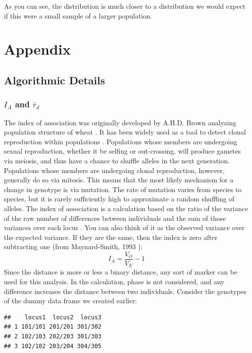 \documentclass[letterpaper]{article}\usepackage[]{graphicx}\usepackage[]{color}
\makeatletter
\newenvironment{kframe}{%
 \def\at@end@of@kframe{}%
 \ifinner\ifhmode%
  \def\at@end@of@kframe{\end{minipage}}%
  \begin{minipage}{\columnwidth}%
 \fi\fi%
 \def\FrameCommand##1{\hskip\@totalleftmargin \hskip-\fboxsep
 \colorbox{shadecolor}{##1}\hskip-\fboxsep
     \hskip-\linewidth \hskip-\@totalleftmargin \hskip\columnwidth}%
 \MakeFramed {\advance\hsize-\width
   \@totalleftmargin\z@ \linewidth\hsize
   \@setminipage}}%
 {\par\unskip\endMakeFramed%
 \at@end@of@kframe}
\newenvironment{knitrout}{}{} %
\newcommand{\beq}{\begin{equation}}
\newcommand{\eeq}{\end{equation}}
\newcommand{\tab}{\hspace*{1em}}
\makeatother
\begin{document}
As you can see, the distribution is much closer to a distribution we would expect if this were a small sample of a larger population. 


\section{Appendix}\label{appendix}
\subsection{Algorithmic Details}\label{appendix:algorithm}
\subsubsection{$I_A$ and $\bar r_d$}\label{appendix:algorithm:iard}

\tab \tab The index of association was originally developed by A.H.D. Brown analyzing population structure of wheat \cite{Brown:1980}. It has been widely used as a tool to detect clonal reproduction within populations \cite{Smith:1993}. Populations whose members are undergoing sexual reproduction, whether it be selfing or out-crossing, will produce gametes via meiosis, and thus have a chance to shuffle alleles in the next generation. Populations whose members are undergoing clonal reproduction, however, generally do so via mitosis. This means that the most likely mechanism for a change in genotype is via mutation. The rate of mutation varies from species to species, but it is rarely sufficiently high to approximate a random shuffling of alleles. The index of association is a calculation based on the ratio of the variance of the raw number of differences between individuals and the sum of those variances over each locus \cite{Smith:1993}. You can also think of it as the observed variance over the expected variance. If they  are the same, then the index is zero after subtracting one (from Maynard-Smith, 1993 \cite{Smith:1993}):
\beq
\label{eq:I_A}
I_A = \frac{V_O}{V_E}-1
\eeq
Since the distance is more or less a binary distance, any sort of marker can be used for this analysis. In the calculation, phase is not considered, and any difference increases the distance between two individuals. Consider the genotypes of the dummy data frame we created earlier:
\begin{knitrout}\footnotesize
{}\color{fgcolor}\begin{kframe}
\begin{verbatim}
##    locus1  locus2  locus3
## 1 101/101 201/201 301/302
## 2 102/103 202/203 301/303
## 3 102/102 203/204 304/305
\end{verbatim}
\end{kframe}
\end{knitrout}
\end{document}
